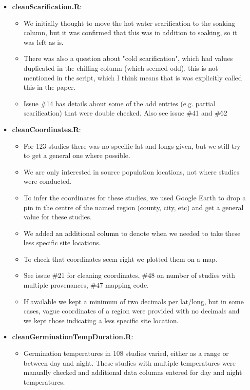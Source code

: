 \documentclass{article}[12pt]
\begin{document}
\begin{enumerate}
\begin{itemize}
\item \textbf{cleanScarification.R}: 
\begin{itemize}
\item We initially thought to move the hot water scarification to the soaking column, but it was confirmed that this was in addition to soaking, so it was left as is. 
\item There was also a question about "cold scarification", which had values duplicated in the chilling column (which seemed odd), this is not mentioned in the script, which I think means that is was explicitly called this in the paper. 
\item Issue \#14 has details about some of the add entries (e.g. partial scarification) that were double checked.  Also see issue \#41 and \#62
\end{itemize}
\item \textbf{cleanCoordinates.R}: 
\begin{itemize}
\item For 123 studies there was no specific lat and longs given, but we still try to get a general one where possible. 
\item We are only interested in source population locations, not where studies were conducted. 
\item To infer the coordinates for these studies, we used Google Earth to drop a pin in the centre of the named region (county, city, etc) and get a general value for these studies. 
\item We added an additional column to denote when we needed to take these less specific site locations. 
\item To check that coordinates seem right we plotted them on a map. 
\item See issue \#21 for cleaning coordinates, \#48 on number of studies with multiple provenances, \#47 mapping code.
\item If available we kept a minimum of two decimals per lat/long, but in some cases, vague coordinates of a region were provided with no decimals and we kept those indicating a less specific site location. %
\end{itemize}
\item \textbf{cleanGerminationTempDuration.R}: 
\begin{itemize} 
\item Germination temperatures in 108 studies varied, either as a range or between day and night. These studies with multiple temperatures were manually checked and additional data columns entered for day and night temperatures. 

\end{itemize}
\end{itemize}
\end{enumerate}
\end{document}
